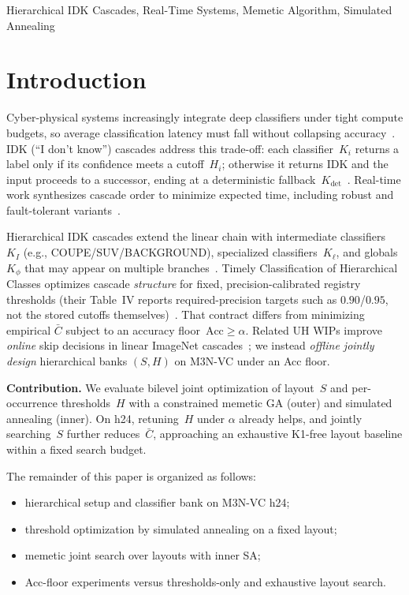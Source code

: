 \documentclass[conference]{IEEEtran}
\begin{document}
\begin{IEEEkeywords}
Hierarchical IDK Cascades, Real-Time Systems, Memetic Algorithm, Simulated Annealing
\end{IEEEkeywords}

\section{Introduction}
Cyber-physical systems increasingly integrate deep classifiers under tight compute budgets, so average classification latency must fall without collapsing accuracy~\cite{abdelzaher2023scheduling,baruah2021optimal}.
IDK (``I don't know'') cascades address this trade-off: each classifier~$K_i$ returns a label only if its confidence meets a cutoff~$H_i$; otherwise it returns IDK and the input proceeds to a successor, ending at a deterministic fallback~$K_{\mathrm{det}}$~\cite{wang2018idk,abdelzaher2023scheduling}.
Real-time work synthesizes cascade order to minimize expected time, including robust and fault-tolerant variants~\cite{baruah2021optimal,baruah2023robust,baruah2024fault}.

Hierarchical IDK cascades extend the linear chain with intermediate classifiers~$K_I$ (e.g., COUPE/SUV/BACKGROUND), specialized classifiers~$K_\ell$, and globals~$K_\phi$ that may appear on multiple branches~\cite{baruah2025timely}.
Timely Classification of Hierarchical Classes optimizes cascade \emph{structure} for fixed, precision-calibrated registry thresholds (their Table~IV reports required-precision targets such as $0.90$/$0.95$, not the stored cutoffs themselves)~\cite{baruah2025timely}.
That contract differs from minimizing empirical $\bar{C}$ subject to an accuracy floor~$\mathrm{Acc}\!\ge\!\alpha$.
Related UH WIPs improve \emph{online} skip decisions in linear ImageNet cascades~\cite{nguyen2024probabilistic,katikaneni2025rfskip}; we instead \emph{offline jointly design} hierarchical banks $(S,H)$ on M3N-VC under an Acc floor.

\textbf{Contribution.}
We evaluate bilevel joint optimization of layout~$S$ and per-occurrence thresholds~$H$ with a constrained memetic GA (outer) and simulated annealing (inner).
On h24, retuning~$H$ under $\alpha$ already helps, and jointly searching~$S$ further reduces~$\bar{C}$, approaching an exhaustive K1-free layout baseline within a fixed search budget.

The remainder of this paper is organized as follows:
\begin{itemize}
\item hierarchical setup and classifier bank on M3N-VC h24;
\item threshold optimization by simulated annealing on a fixed layout;
\item memetic joint search over layouts with inner SA;
\item Acc-floor experiments versus thresholds-only and exhaustive layout search.
\end{itemize}
\end{document}
